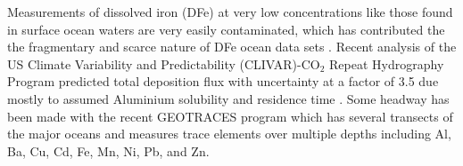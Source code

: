Measurements of dissolved iron (DFe) at very low concentrations like those found in surface ocean waters are very easily contaminated, which has contributed the the fragmentary and scarce nature of DFe ocean data sets \cite{Rijkenberg_2014}.
Recent analysis of the US Climate Variability and Predictability (CLIVAR)-CO$_{2}$ Repeat Hydrography Program predicted total deposition flux with uncertainty at a factor of 3.5 due mostly to assumed Aluminium solubility and residence time \cite{Grand_2015}.
Some headway has been made with the recent GEOTRACES program which has several transects of the major oceans and measures trace elements over multiple depths including Al, Ba, Cu, Cd, Fe, Mn, Ni, Pb, and Zn.
  
  
  
  
  
  
  
  
  
  
  
  